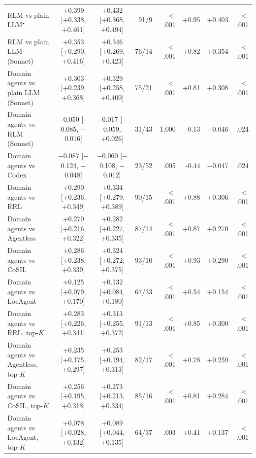 \begin{table}[t]
\begin{tabular}{lccrrrrr}
RLM vs plain LLM$^\star$ & +0.399 [+0.338, +0.461] & +0.432 [+0.368, +0.494] & 91/9 & $<$.001 & +0.95 & +0.403 & $<$.001 \\
RLM vs plain LLM (Sonnet) & +0.353 [+0.290, +0.416] & +0.346 [+0.269, +0.423] & 76/14 & $<$.001 & +0.82 & +0.354 & $<$.001 \\
Domain agents vs plain LLM (Sonnet) & +0.303 [+0.239, +0.368] & +0.329 [+0.258, +0.400] & 75/21 & $<$.001 & +0.81 & +0.308 & $<$.001 \\
Domain agents vs RLM (Sonnet) & $-$0.050 [$-$0.085, $-$0.016] & $-$0.017 [$-$0.059, +0.026] & 31/43 & 1.000 & -0.13 & $-$0.046 & .024 \\
Domain agents vs Codex & $-$0.087 [$-$0.124, $-$0.048] & $-$0.060 [$-$0.108, $-$0.012] & 23/52 & .005 & -0.44 & $-$0.047 & .024 \\
Domain agents vs RRL & +0.290 [+0.236, +0.349] & +0.334 [+0.279, +0.389] & 90/15 & $<$.001 & +0.88 & +0.306 & $<$.001 \\
Domain agents vs Agentless & +0.270 [+0.216, +0.322] & +0.282 [+0.227, +0.335] & 87/14 & $<$.001 & +0.87 & +0.270 & $<$.001 \\
Domain agents vs CoSIL & +0.286 [+0.238, +0.339] & +0.324 [+0.272, +0.375] & 93/10 & $<$.001 & +0.93 & +0.290 & $<$.001 \\
Domain agents vs LocAgent & +0.125 [+0.079, +0.170] & +0.132 [+0.084, +0.180] & 67/33 & $<$.001 & +0.54 & +0.154 & $<$.001 \\
Domain agents vs RRL, top-$K$ & +0.283 [+0.226, +0.341] & +0.313 [+0.255, +0.372] & 91/13 & $<$.001 & +0.85 & +0.300 & $<$.001 \\
Domain agents vs Agentless, top-$K$ & +0.235 [+0.175, +0.297] & +0.253 [+0.194, +0.313] & 82/17 & $<$.001 & +0.78 & +0.259 & $<$.001 \\
Domain agents vs CoSIL, top-$K$ & +0.256 [+0.195, +0.318] & +0.273 [+0.213, +0.334] & 85/16 & $<$.001 & +0.81 & +0.284 & $<$.001 \\
Domain agents vs LocAgent, top-$K$ & +0.078 [+0.028, +0.132] & +0.089 [+0.044, +0.135] & 64/37 & .003 & +0.41 & +0.137 & $<$.001 \\
\bottomrule
\end{tabular}
\end{table}
